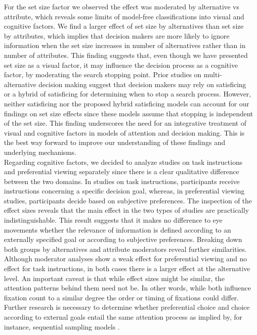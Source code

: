 For the set size factor we observed the effect was moderated by alternative vs attribute, which reveals some limits of model-free classifications into visual and cognitive factors. We find a larger effect of set size by alternatives than set size by attributes, which implies that decision makers are more likely to ignore information when the set size increases in number of alternatives rather than in number of attributes. This finding suggests that, even though we have presented set size as a visual factor, it may influence the decision process as a cognitive factor, by moderating the search stopping point. Prior studies on multi-alternative decision making \cite{reutskaja2011, stuttgen2012, thomas2020} suggest that decision makers may rely on satisficing or a hybrid of satisficing for determining when to stop a search process. However, neither satisficing nor the proposed hybrid satisficing models can account for our findings on set size effects since these models assume that stopping is independent of the set size. This finding underscores the need for an integrative treatment of visual and cognitive factors in models of attention and decision making. This is the best way forward to improve our understanding of these findings and underlying mechanisms.\\

Regarding cognitive factors, we decided to analyze studies on task instructions and preferential viewing separately since there is a clear qualitative difference between the two domains. In studies on task instructions, participants receive instructions concerning a specific decision goal, whereas, in preferential viewing studies, participants decide based on subjective preferences. The inspection of the effect sizes reveals that the main effect in the two types of studies are practically indistinguishable. This result suggests that it makes no difference to eye movements whether the relevance of information is defined according to an externally specified goal or according to subjective preferences. Breaking down both groups by alternatives and attribute moderators reveal further similarities. Although moderator analyses show a weak effect for preferential viewing and no effect for task instructions, in both cases there is a larger effect at the alternative level. An important caveat is that while effect sizes might be similar, the attention patterns behind them need not be. In other words, while both influence fixation count to a similar degree the order or timing of fixations could differ. Further research is necessary to determine whether preferential choice and choice according to external goals entail the same attention process as implied by, for instance, sequential sampling models \citep{forstmann2016}.\\ 

